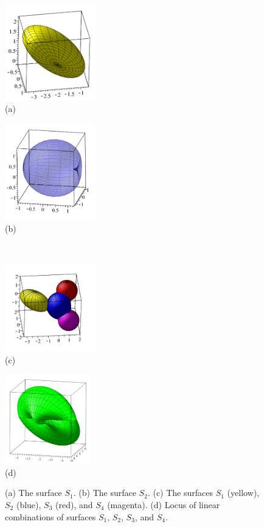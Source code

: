 \documentclass[12pt,a4paper]{article}%
\begin{document}
\begin{figure}
\begin{center}
\parbox[b]{1.6in}{\begin{center}
\includegraphics[natheight=2.407300in,natwidth=2.315000in,height=1.6329in,width=1.5708in]{PJH75H1E.pdf}
\\
(a)
\end{center}}
\qquad
\parbox[b]{1.6in}{\begin{center}
\includegraphics[natheight=2.670700in,natwidth=2.521700in,height=1.648in,width=1.5575in]{PJH75H1F.pdf}
\\
(b)
\end{center}}
\\
\parbox[b]{1.6in}{\begin{center}
\includegraphics[natheight=2.485300in,natwidth=2.585600in,height=1.5034in,width=1.5638in]{PJH75H1G.pdf}
\\
(c)
\end{center}}
\qquad
\parbox[b]{1.6in}{\begin{center}
\includegraphics[natheight=4.387000in,natwidth=4.245100in,height=1.5292in,width=1.4804in]{PJH75H1H.pdf}
\\
(d)
\end{center}}
\end{center}
\caption{(a) The surface $S_1$.
              (b) The surface $S_2$.
              (c) The surfaces $S_1$ (yellow), $S_2$ (blue), $S_3$ (red), and $S_4$ (magenta).
              (d) Locus of linear combinations of surfaces $S_1$, $S_2$, $S_3$, and $S_4$.}
\label{fig9}
\end{figure}
\end{document}
